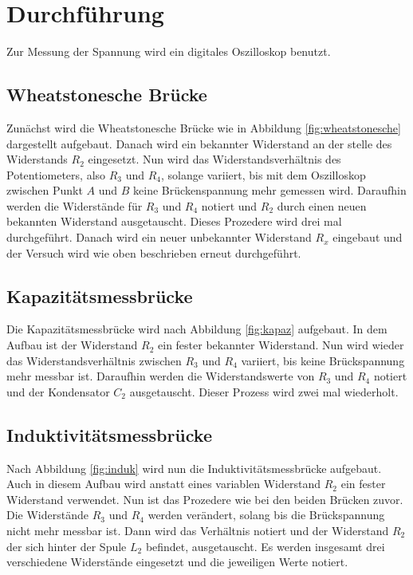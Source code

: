 \section{Durchführung}
\label{sec:Durchführung}

Zur Messung der Spannung wird ein digitales Oszilloskop benutzt.

\subsection{Wheatstonesche Brücke}

Zunächst wird die Wheatstonesche Brücke wie in Abbildung \ref{fig:wheatstonesche} dargestellt aufgebaut.
Danach wird ein bekannter Widerstand an der stelle des Widerstands $R_2$ eingesetzt.
Nun wird das Widerstandsverhältnis des Potentiometers, also $R_3$ und $R_4$, solange variiert, bis mit dem Oszilloskop zwischen Punkt $A$ und $B$ keine Brückenspannung mehr gemessen wird.
Daraufhin werden die Widerstände für $R_3$ und $R_4$ notiert und $R_2$ durch einen neuen bekannten Widerstand ausgetauscht.
Dieses Prozedere wird drei mal durchgeführt.
Danach wird ein neuer unbekannter Widerstand $R_x$ eingebaut und der Versuch wird wie oben beschrieben erneut durchgeführt.

\subsection{Kapazitätsmessbrücke}

Die Kapazitätsmessbrücke wird nach Abbildung \ref{fig:kapaz} aufgebaut.
In dem Aufbau ist der Widerstand $R_2$ ein fester bekannter Widerstand.
Nun wird wieder das Widerstandsverhältnis zwischen $R_3$ und $R_4$ variiert, bis keine Brückspannung mehr messbar ist.
Daraufhin werden die Widerstandswerte von $R_3$ und $R_4$ notiert und der Kondensator $C_2$ ausgetauscht.
Dieser Prozess wird zwei mal wiederholt.

\subsection{Induktivitätsmessbrücke}

Nach Abbildung \ref{fig:induk} wird nun die Induktivitätsmessbrücke aufgebaut.
Auch in diesem Aufbau wird anstatt eines variablen Widerstand $R_2$ ein fester Widerstand verwendet.
Nun ist das Prozedere wie bei den beiden Brücken zuvor. Die Widerstände $R_3$ und $R_4$ werden verändert, solang bis die Brückspannung nicht mehr messbar ist.
Dann wird das Verhältnis notiert und der Widerstand $R_2$ der sich hinter der Spule $L_2$ befindet, ausgetauscht.
Es werden insgesamt drei verschiedene Widerstände eingesetzt und die jeweiligen Werte notiert.

